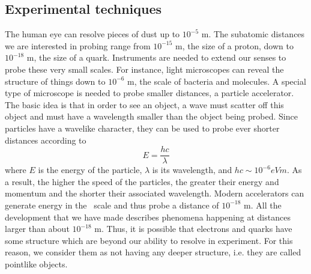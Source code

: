 \subsection*{Experimental techniques}

The human eye can resolve pieces of dust up to $10^{-5}$ m.
The subatomic distances we are interested in probing range
from  $10^{-15}$ m, the size of a proton, 
down to $10^{-18}$ m, the size of a quark.
Instruments are needed to extend our senses to 
probe these very small scales.
For instance, light microscopes can reveal the structure of things down to 
$10^{-6}$ m, the scale of bacteria and molecules. 
A special type of microscope is needed to probe smaller distances, 
 a particle accelerator.
The basic idea is that in order to see an object, a wave must scatter off 
this object and must have a wavelength smaller than the object being 
probed.
Since particles have a wavelike character, they can be used to 
probe ever shorter distances according to
\[
E = \frac{hc}{\lambda}
\]
where $E$ is the energy of the particle, $\lambda$ is its wavelength, 
and $hc \sim 10^{-6} eV m$. As a result, 
the higher the speed of the particles, the greater their 
energy and momentum and the shorter their associated wavelength.
Modern accelerators can generate energy in the \TeV~scale and thus probe 
a distance of $10^{-18}$ m.
All the development that we have made 
describes phenomena happening at distances larger than about $10^{-18}$ m.
Thus, it is possible that electrons and quarks have some structure which are 
beyond our ability to resolve in experiment. For this reason, we consider 
them as not having any deeper structure, i.e. they are called pointlike objects. 

